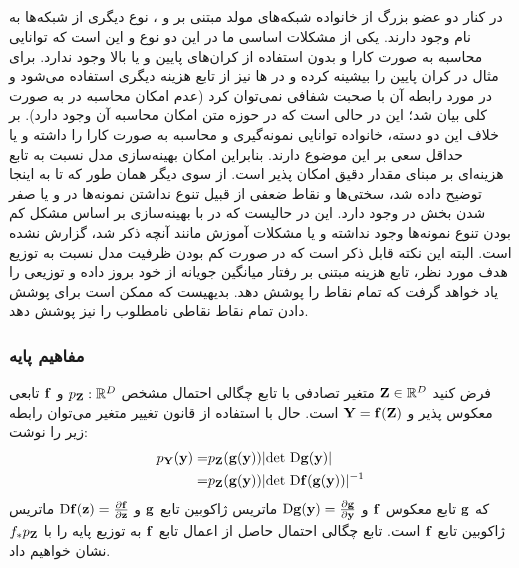 \subsection{\normalizingflownets{}}
در کنار دو عضو بزرگ از خانواده شبکه‌های مولد مبتنی بر \vae{} و \gan{}، نوع دیگری از شبکه‌ها به نام \normalizingflownets{} وجود دارند. یکی از مشکلات اساسی ما در این دو نوع \vae{} و \gan{} این است که توانایی محاسبه \likelihood{} به صورت کارا و بدون استفاده از کران‌های پایین و یا بالا وجود ندارد. برای مثال در \vae{} کران پایین \likelihood{} را بیشینه کرده و در \gan{}‌ها نیز از تابع هزینه دیگری استفاده می‌شود و در مورد رابطه آن با \likelihood{} صحبت شفافی نمی‌توان کرد (عدم امکان محاسبه \likelihood{} در \gan{} به صورت کلی بیان شد؛ این در حالی است که در حوزه متن امکان محاسبه آن وجود دارد).  بر خلاف این دو دسته، خانواده \normalizingflownets{} توانایی نمونه‌گیری و محاسبه \likelihood{} به صورت کارا را داشته و یا حداقل سعی بر این موضوع دارند. بنابراین امکان بهینه‌سازی مدل نسبت به تابع هزینه‌ای بر مبنای مقدار دقیق \likelihood{} امکان پذیر است. از سوی دیگر همان طور که تا به اینجا توضیح داده شد، سختی‌ها و نقاط ضعفی از قبیل تنوع نداشتن نمونه‌ها در \gan{} و یا صفر شدن بخش  در \vae{} وجود دارد. این در حالیست که در \normalizingflownets{} با بهینه‌سازی بر اساس \likelihood{} مشکل کم بودن تنوع نمونه‌ها وجود نداشته و یا مشکلات آموزش مانند آنچه ذکر شد، گزارش نشده است. البته این نکته قابل ذکر است که در صورت کم بودن ظرفیت مدل نسبت به توزیع هدف مورد نظر، تابع هزینه مبتنی بر \likelihood{} رفتار میانگین جویانه از خود بروز داده و توزیعی را یاد خواهد گرفت که تمام نقاط را پوشش دهد. بدیهیست که ممکن است برای پوشش دادن تمام نقاط نقاطی نامطلوب را نیز پوشش دهد.
\subsubsection{مفاهیم پایه}
فرض کنید
${\bf{ Z}} \in \mathbb{R}^{D}$
متغیر تصادفی با تابع چگالی احتمال مشخص
$p_{\bf Z}: \mathbb{R}^D$
و $\bf f$ تابعی معکوس پذیر و
${\bf Y} = {\bf f}({\bf Z})$
است. حال با استفاده از قانون تغییر متغیر می‌توان رابطه زیر را نوشت:
\begin{align}  \label{eq:flow_target_dist}
	p_{\bf Y}({\bf y}) = & p_{\bf Z}({\bf g}({\bf y}))
	|\text{det} ~ \text{D} {\bf g}({\bf y})|
	\nonumber                                          \\
	=                    & p_{\bf Z}({\bf g}({\bf y}))
	|\text{det} ~ \text{D} {\bf f}({\bf g}({\bf y}))|^{-1}
\end{align}
که $\bf g$ تابع معکوس $\bf f$ و
$\text{D} {\bf g}({\bf y}) = \frac{\partial {\bf g}}{\partial {\bf y}}$
ماتریس ژاکوبین تابع $\bf g$ و
$\text{D} {\bf f}({\bf z}) = \frac{\partial {\bf f}}{\partial {\bf z}}$
ماتریس ژاکوبین تابع $\bf f$ است. تابع چگالی احتمال حاصل از اعمال تابع $\bf f$ به توزیع پایه را با
$f_*p_{\bf Z}$
نشان خواهیم داد.

